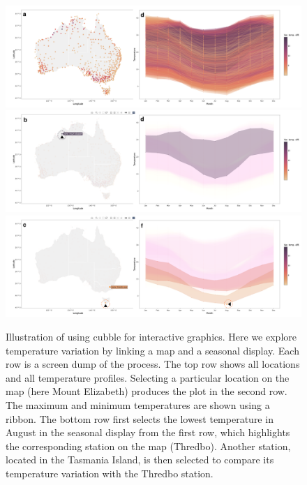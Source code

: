 \documentclass[
  shortnames]{jss}
\begin{document}
\begin{CodeChunk}
\begin{figure}

{\centering \includegraphics[width=1\linewidth,height=0.23\textheight]{figures/linking} \includegraphics[width=1\linewidth,height=0.23\textheight]{figures/linking-north} \includegraphics[width=1\linewidth,height=0.23\textheight]{figures/linking-lower} 

}

\caption[Illustration of using cubble for interactive graphics]{Illustration of using cubble for interactive graphics. Here we explore temperature variation by linking a map and a seasonal display. Each row is a screen dump of the process. The top row shows all locations and all temperature profiles. Selecting a particular location on the map (here Mount Elizabeth) produces the plot in the second row. The maximum and minimum temperatures are shown using a ribbon. The bottom row first selects the lowest temperature in August in the seasonal display from the first row, which highlights the corresponding station on the map (Thredbo). Another  station, located in the Tasmania Island, is then selected to compare its temperature variation with the Thredbo station.}\label{fig:interactive-linking}
\end{figure}
\end{CodeChunk}
\end{document}
